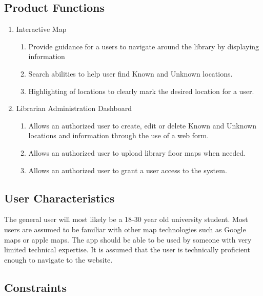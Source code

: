 \documentclass[letterpaper,10pt,titlepage, onecolumn, compsoc]{IEEEtran}
\begin{document}

\subsection{Product Functions}
\begin{enumerate}
	\item Interactive Map
    \begin{enumerate}
    	\item Provide guidance for a users to navigate around the library by displaying information
        \item Search abilities to help user find Known and Unknown locations.
        \item Highlighting of locations to clearly mark the desired location for a user.
    \end{enumerate}
    \item Librarian Administration Dashboard
    \begin{enumerate}
    	\item Allows an authorized user to create, edit or delete Known and Unknown locations and information through the use of a web form.
        \item Allows an authorized user to upload library floor maps when needed.
        \item Allows an authorized user to grant a user access to the system.
    \end{enumerate}
    
\end{enumerate}

\subsection{User Characteristics}
The general user will most likely be a 18-30 year old university student. Most users are assumed to be familiar with other map technologies such as Google maps or apple maps. The app should be able to be used by someone with very limited technical expertise. It is assumed that the user is technically proficient enough to navigate to the website.

\subsection{Constraints}
\end{document}
